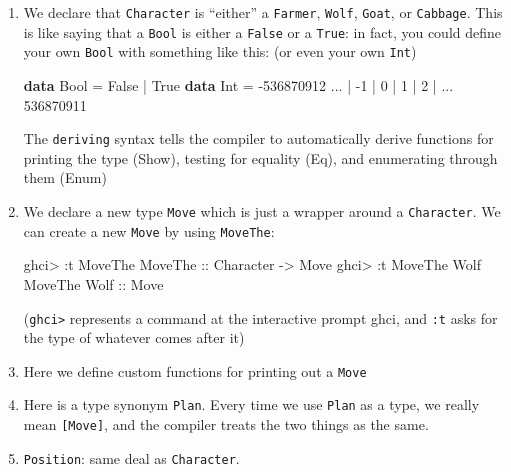 \documentclass[]{article}
\newenvironment{Shaded}{}{}
\newcommand{\KeywordTok}[1]{\textcolor[rgb]{0.00,0.44,0.13}{\textbf{{#1}}}}
\newcommand{\DataTypeTok}[1]{\textcolor[rgb]{0.56,0.13,0.00}{{#1}}}
\newcommand{\DecValTok}[1]{\textcolor[rgb]{0.25,0.63,0.44}{{#1}}}
\newcommand{\OtherTok}[1]{\textcolor[rgb]{0.00,0.44,0.13}{{#1}}}
\newcommand{\FunctionTok}[1]{\textcolor[rgb]{0.02,0.16,0.49}{{#1}}}
\newcommand{\NormalTok}[1]{{#1}}
\begin{document}
\begin{enumerate}
\def\labelenumi{\arabic{enumi}.}
\item
  We declare that \texttt{Character} is ``either'' a \texttt{Farmer},
  \texttt{Wolf}, \texttt{Goat}, or \texttt{Cabbage}. This is like saying
  that a \texttt{Bool} is either a \texttt{False} or a \texttt{True}: in
  fact, you could define your own \texttt{Bool} with something like
  this: (or even your own \texttt{Int})

\begin{Shaded}
\begin{Highlighting}[]
\KeywordTok{data} \DataTypeTok{Bool} \FunctionTok{=} \DataTypeTok{False} \FunctionTok{|} \DataTypeTok{True}
\KeywordTok{data} \DataTypeTok{Int} \FunctionTok{=} \FunctionTok{-}\DecValTok{536870912} \FunctionTok{...} \FunctionTok{|} \FunctionTok{-}\DecValTok{1} \FunctionTok{|} \DecValTok{0} \FunctionTok{|} \DecValTok{1} \FunctionTok{|} \DecValTok{2} \FunctionTok{|} \FunctionTok{...} \DecValTok{536870911}
\end{Highlighting}
\end{Shaded}

  The \texttt{deriving} syntax tells the compiler to automatically
  derive functions for printing the type (Show), testing for equality
  (Eq), and enumerating through them (Enum)
\item
  We declare a new type \texttt{Move} which is just a wrapper around a
  \texttt{Character}. We can create a new \texttt{Move} by using
  \texttt{MoveThe}:

\begin{Shaded}
\begin{Highlighting}[]
\NormalTok{ghci}\FunctionTok{>} \FunctionTok{:}\NormalTok{t }\DataTypeTok{MoveThe}
\DataTypeTok{MoveThe}\OtherTok{ ::} \DataTypeTok{Character} \OtherTok{->} \DataTypeTok{Move}
\NormalTok{ghci}\FunctionTok{>} \FunctionTok{:}\NormalTok{t }\DataTypeTok{MoveThe} \DataTypeTok{Wolf}
\DataTypeTok{MoveThe} \DataTypeTok{Wolf}\OtherTok{ ::} \DataTypeTok{Move}
\end{Highlighting}
\end{Shaded}

  (\texttt{ghci\textgreater{}} represents a command at the interactive
  prompt ghci, and \texttt{:t} asks for the type of whatever comes after
  it)
\item
  Here we define custom functions for printing out a \texttt{Move}
\item
  Here is a type synonym \texttt{Plan}. Every time we use \texttt{Plan}
  as a type, we really mean \texttt{{[}Move{]}}, and the compiler treats
  the two things as the same.
\item
  \texttt{Position}: same deal as \texttt{Character}.
\end{enumerate}
\end{document}
